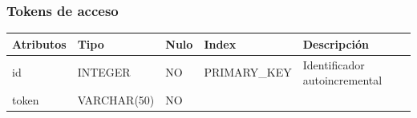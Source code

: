 \documentclass[12pt,a4paperpaper,]{report}
\begin{document}
\subsubsection{Tokens de acceso}\label{tokens-de-acceso}

\begin{longtable}[]{@{}lllll@{}}
\toprule
\begin{minipage}[b]{0.21\columnwidth}\raggedright\strut
Atributos\strut
\end{minipage} & \begin{minipage}[b]{0.19\columnwidth}\raggedright\strut
Tipo\strut
\end{minipage} & \begin{minipage}[b]{0.16\columnwidth}\raggedright\strut
Nulo\strut
\end{minipage} & \begin{minipage}[b]{0.19\columnwidth}\raggedright\strut
Index\strut
\end{minipage} & \begin{minipage}[b]{0.11\columnwidth}\raggedright\strut
Descripción\strut
\end{minipage}\tabularnewline
\midrule
\endhead
\begin{minipage}[t]{0.21\columnwidth}\raggedright\strut
id\strut
\end{minipage} & \begin{minipage}[t]{0.19\columnwidth}\raggedright\strut
INTEGER\strut
\end{minipage} & \begin{minipage}[t]{0.16\columnwidth}\raggedright\strut
NO\strut
\end{minipage} & \begin{minipage}[t]{0.19\columnwidth}\raggedright\strut
PRIMARY\_KEY\strut
\end{minipage} & \begin{minipage}[t]{0.11\columnwidth}\raggedright\strut
Identificador autoincremental\strut
\end{minipage}\tabularnewline
\begin{minipage}[t]{0.21\columnwidth}\raggedright\strut
token\strut
\end{minipage} & \begin{minipage}[t]{0.19\columnwidth}\raggedright\strut
VARCHAR(50)\strut
\end{minipage} & \begin{minipage}[t]{0.16\columnwidth}\raggedright\strut
NO\strut
\end{minipage} & \begin{minipage}[t]{0.19\columnwidth}\raggedright\strut

\end{minipage}
\end{longtable}
\end{document}
